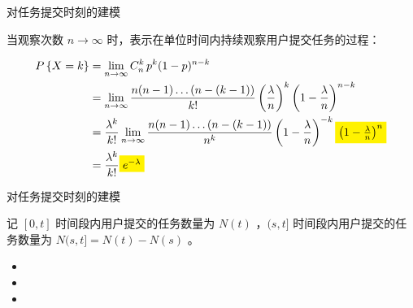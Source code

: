\begin{frame}{对任务提交时刻的建模}

    当观察次数 $n \rightarrow \infty$ 时，表示在单位时间内持续观察用户提交任务的过程：

    \begin{equation*}
        \begin{split}
            P\left\{X=k\right\} & = \lim_{n \rightarrow \infty} C_n^k \, p^k (1-p)^{n-k}                                                                                                                              \\
            & = \lim_{n \rightarrow \infty} \frac{n(n-1)\dots(n-(k-1))}{k!} \left(\frac{\lambda}{n}\right)^k \left(1-\frac{\lambda}{n}\right)^{n-k}                                               \\
            & = \frac{\lambda^k}{k!} \lim_{n \rightarrow \infty} \frac{n(n-1)\dots(n-(k-1))}{n^k} \left(1-\frac{\lambda}{n}\right)^{-k} \colorbox{yellow}{$\left(1-\frac{\lambda}{n}\right)^{n}$} \\
            & = \frac{\lambda^k}{k!} \colorbox{yellow}{$e^{-\lambda}$}
        \end{split}
    \end{equation*}


\end{frame}

\begin{frame}{对任务提交时刻的建模}

    记 $[0,t]$ 时间段内用户提交的任务数量为 $N(t)$ ，$(s,t]$ 时间段内用户提交的任务数量为 $N(s,t] = N(t) - N(s)$ 。

    \begin{block}{}
        \begin{itemize}
            \item {}
            \item {}
            \item {}
        \end{itemize}
    \end{block}

    \uncover<9->{
        因此 $\forall s, N(s,s+t] \sim P(\lambda t)$ ：
        $$P\left\{N(s,s+t]=k\right\} = \frac{(\lambda t)^k}{k!} e^{-\lambda t}$$
    }

\end{frame}

